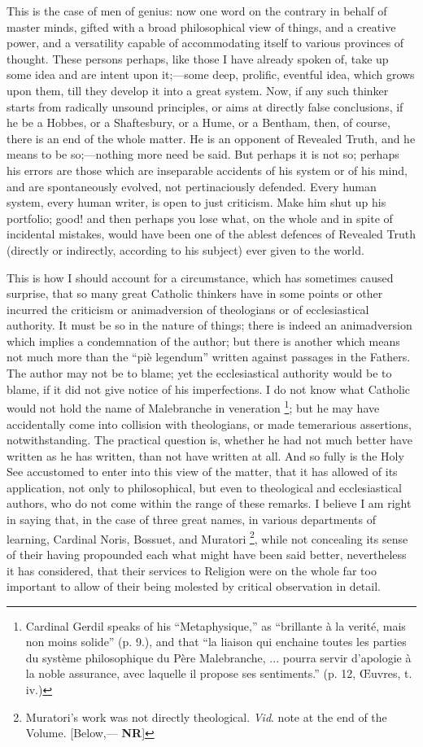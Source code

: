 This is the case of men of genius: now one word on the contrary in
behalf of master minds, gifted with a broad philosophical view of
things, and a creative power, and a versatility capable of
accommodating itself to various provinces of thought. These persons
perhaps, like those I have already spoken of, take up some idea and
are intent upon it;—some deep, prolific, eventful idea, which grows
upon them, till they develop it into a great system. Now, if any such
thinker starts from radically unsound principles, or aims at
directly false conclusions, if he be a Hobbes, or a Shaftesbury, or a
Hume, or a Bentham, then, of course, there is an end of the whole
matter. He is an opponent of Revealed Truth, and he means to be so;—nothing
more need be said. But perhaps it is not so; perhaps his errors are
those which are inseparable accidents of his system or of his mind,
and are spontaneously evolved, not pertinaciously defended. Every
human system, every human writer, is open to just criticism. Make him
shut up his portfolio; good! and then perhaps you lose what, on the
whole and in spite of incidental mistakes, would have been one of the
ablest defences of Revealed Truth (directly or indirectly, according
to his subject) ever given to the world.

This is how I should account for a circumstance, which has
sometimes caused surprise, that so many great Catholic thinkers have
in some points or other incurred the criticism or animadversion of
theologians or of ecclesiastical authority. It must be so in the
nature of things; there is indeed an animadversion which implies a
condemnation of the author; but there is another which means not much
more than the ``piè legendum'' written against passages in
the Fathers. The author may not be to blame; yet the ecclesiastical
authority would be to blame, if it did not give notice of his
imperfections. I do not know what Catholic would not hold the name of
Malebranche in veneration \footnote{Cardinal Gerdil speaks of his ``Metaphysique,'' as
``brillante à la verité, mais non moins solide'' (p. 9.),
and that ``la liaison qui enchaine toutes les parties du système
philosophique du Père Malebranche, ... pourra servir d'apologie à la
noble assurance, avec laquelle il propose ses sentiments.'' (p.
12, Œuvres, t. iv.)};
but he may have accidentally come into collision with theologians, or
made temerarious assertions, notwithstanding. The practical
question is, whether he had not much better have written as he has
written, than not have written at all. And so fully is the Holy See
accustomed to enter into this view of the matter, that it has allowed
of its application, not only to philosophical, but even to theological
and ecclesiastical authors, who do not come within the range of these
remarks. I believe I am right in saying that, in the case of three
great names, in various departments of learning, Cardinal Noris,
Bossuet, and Muratori \footnote{Muratori's work
was not directly theological. \emph{Vid}. note at the end of the
Volume. [Below,— \textbf{NR}]},
while not concealing its sense of their having propounded each what
might have been said better, nevertheless it has considered, that
their services to Religion were on the whole far too important to
allow of their being molested by critical observation in detail.

